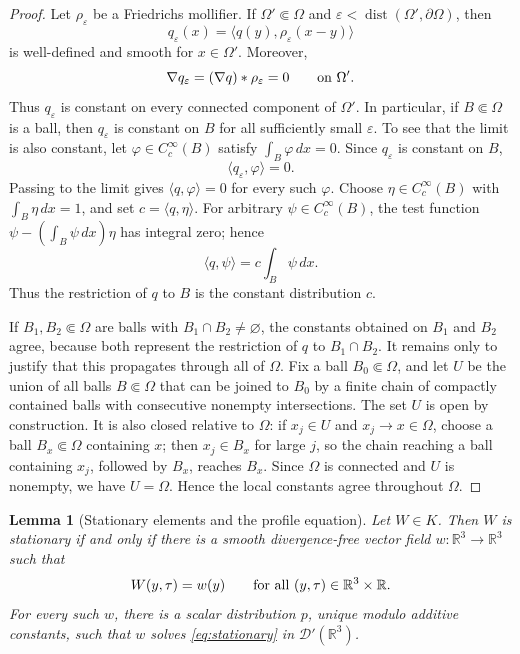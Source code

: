 \documentclass[11pt]{amsart}
\theoremstyle{plain}
\newtheorem{lemma}[theorem]{Lemma}
\theoremstyle{definition}
\theoremstyle{remark}
\numberwithin{equation}{section}
\begin{document}
\begin{proof}
Let \(\rho_\varepsilon\) be a Friedrichs mollifier.  If
\(\Omega'\Subset\Omega\) and
\(\varepsilon<\operatorname{dist}(\Omega',\partial\Omega)\), then
\[
   q_\varepsilon(x)
   =
   \langle q(y),\rho_\varepsilon(x-y)\rangle
\]
is well-defined and smooth for \(x\in\Omega'\).  Moreover,
\[
   \nabla q_\varepsilon
   =
   (\nabla q)*\rho_\varepsilon
   =
   0
   \qquad\hbox{on }\Omega' .
\]
Thus \(q_\varepsilon\) is constant on every connected component of
\(\Omega'\).  In particular, if \(B\Subset\Omega\) is a ball, then
\(q_\varepsilon\) is constant on \(B\) for all sufficiently small
\(\varepsilon\).  To see that the limit is also constant, let
\(\varphi\in C_c^\infty(B)\) satisfy \(\int_B\varphi\,dx=0\).  Since
\(q_\varepsilon\) is constant on \(B\),
\[
   \langle q_\varepsilon,\varphi\rangle=0 .
\]
Passing to the limit gives \(\langle q,\varphi\rangle=0\) for every such
\(\varphi\).  Choose \(\eta\in C_c^\infty(B)\) with \(\int_B\eta\,dx=1\), and
set \(c=\langle q,\eta\rangle\).  For arbitrary
\(\psi\in C_c^\infty(B)\), the test function
\(\psi-(\int_B\psi\,dx)\eta\) has integral zero; hence
\[
   \langle q,\psi\rangle
   =
   c\int_B\psi\,dx .
\]
Thus the restriction of \(q\) to \(B\) is the constant distribution \(c\).

If \(B_1,B_2\Subset\Omega\) are balls with \(B_1\cap B_2\ne\varnothing\), the
constants obtained on \(B_1\) and \(B_2\) agree, because both represent the
restriction of \(q\) to \(B_1\cap B_2\).  It remains only to justify that this
propagates through all of \(\Omega\).  Fix a ball \(B_0\Subset\Omega\), and
let \(U\) be the union of all balls \(B\Subset\Omega\) that can be joined to
\(B_0\) by a finite chain of compactly contained balls with consecutive
nonempty intersections.  The set \(U\) is open by construction.  It is also
closed relative to \(\Omega\): if \(x_j\in U\) and \(x_j\to x\in\Omega\),
choose a ball \(B_x\Subset\Omega\) containing \(x\); then \(x_j\in B_x\) for
large \(j\), so the chain reaching a ball containing \(x_j\), followed by
\(B_x\), reaches \(B_x\).  Since \(\Omega\) is connected and \(U\) is nonempty,
we have \(U=\Omega\).  Hence the local constants agree throughout \(\Omega\).
\end{proof}

\begin{lemma}[Stationary elements and the profile equation]
\label{lem:stationary-profile}
Let \(W\in K\).  Then \(W\) is stationary if and only if there is a smooth
divergence-free vector field \(w:\mathbb R^3\to\mathbb R^3\) such that
\[
   W(y,\tau)=w(y)
   \qquad\hbox{for all }(y,\tau)\in\mathbb R^3\times\mathbb R .
\]
For every such \(w\), there is a scalar distribution \(p\), unique modulo
additive constants, such that \(w\) solves \eqref{eq:stationary} in
\(\mathcal D'(\mathbb R^3)\).
\end{lemma}
\end{document}
